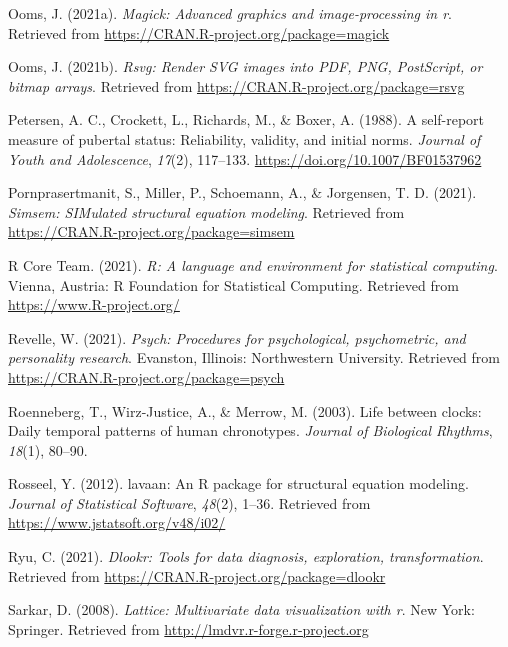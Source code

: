 \documentclass[
  english,
  man]{apa6}
\newlength{\cslhangindent}
\newlength{\cslentryspacingunit} %
\newenvironment{CSLReferences}[2] %
 {%
  \setlength{\parindent}{0pt}
  \ifodd #1
  \let\oldpar\par
  \def\par{\hangindent=\cslhangindent\oldpar}
  \fi
  \setlength{\parskip}{#2\cslentryspacingunit}
 }%
 {}
\begin{document}
\begin{CSLReferences}{1}{0}
\leavevmode{}%
Ooms, J. (2021a). \emph{Magick: Advanced graphics and image-processing in r}. Retrieved from \url{https://CRAN.R-project.org/package=magick}

\leavevmode{}%
Ooms, J. (2021b). \emph{Rsvg: Render SVG images into PDF, PNG, PostScript, or bitmap arrays}. Retrieved from \url{https://CRAN.R-project.org/package=rsvg}

\leavevmode{}%
Petersen, A. C., Crockett, L., Richards, M., \& Boxer, A. (1988). A self-report measure of pubertal status: Reliability, validity, and initial norms. \emph{Journal of Youth and Adolescence}, \emph{17}(2), 117--133. \url{https://doi.org/10.1007/BF01537962}

\leavevmode{}%
Pornprasertmanit, S., Miller, P., Schoemann, A., \& Jorgensen, T. D. (2021). \emph{Simsem: SIMulated structural equation modeling}. Retrieved from \url{https://CRAN.R-project.org/package=simsem}

\leavevmode{}%
R Core Team. (2021). \emph{R: A language and environment for statistical computing}. Vienna, Austria: R Foundation for Statistical Computing. Retrieved from \url{https://www.R-project.org/}

\leavevmode{}%
Revelle, W. (2021). \emph{Psych: Procedures for psychological, psychometric, and personality research}. Evanston, Illinois: Northwestern University. Retrieved from \url{https://CRAN.R-project.org/package=psych}

\leavevmode{}%
Roenneberg, T., Wirz-Justice, A., \& Merrow, M. (2003). Life between clocks: Daily temporal patterns of human chronotypes. \emph{Journal of Biological Rhythms}, \emph{18}(1), 80--90.

\leavevmode{}%
Rosseel, Y. (2012). {lavaan}: An {R} package for structural equation modeling. \emph{Journal of Statistical Software}, \emph{48}(2), 1--36. Retrieved from \url{https://www.jstatsoft.org/v48/i02/}

\leavevmode{}%
Ryu, C. (2021). \emph{Dlookr: Tools for data diagnosis, exploration, transformation}. Retrieved from \url{https://CRAN.R-project.org/package=dlookr}

\leavevmode{}%
Sarkar, D. (2008). \emph{Lattice: Multivariate data visualization with r}. New York: Springer. Retrieved from \url{http://lmdvr.r-forge.r-project.org}


\end{CSLReferences}
\end{document}
